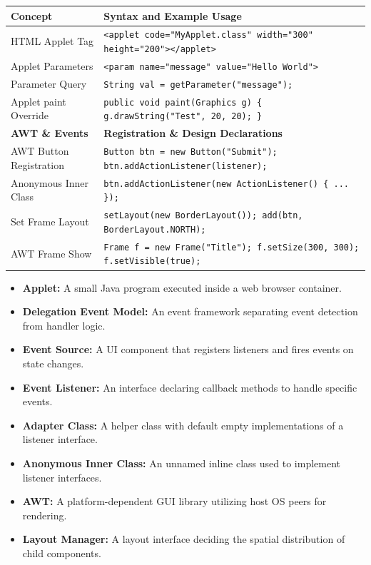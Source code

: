 \documentclass[12pt,a4paper]{article}
\renewcommand{\arraystretch}{1.45}
\begin{document}
\begin{tcolorbox}[formulabox, title={\textbf{HTML Applet \& Event Handling Syntax}}]
{\renewcommand{\arraystretch}{1.3}%
\begin{tabularx}{\linewidth}{l Y}
\textbf{Concept} & \textbf{Syntax and Example Usage} \\
\hline
HTML Applet Tag & \texttt{<applet code="MyApplet.class" width="300" height="200"></applet>} \\
Applet Parameters & \texttt{<param name="message" value="Hello World">} \\
Parameter Query & \texttt{String val = getParameter("message");} \\
Applet paint Override & \texttt{public void paint(Graphics g) \{ g.drawString("Test", 20, 20); \}} \\
\hline
\textbf{AWT \& Events} & \textbf{Registration \& Design Declarations} \\
\hline
AWT Button Registration & \texttt{Button btn = new Button("Submit"); btn.addActionListener(listener);} \\
Anonymous Inner Class & \texttt{btn.addActionListener(new ActionListener() \{ ... \});} \\
Set Frame Layout & \texttt{setLayout(new BorderLayout()); add(btn, BorderLayout.NORTH);} \\
AWT Frame Show & \texttt{Frame f = new Frame("Title"); f.setSize(300, 300); f.setVisible(true);} \\
\end{tabularx}}
\end{tcolorbox}

\begin{tcolorbox}[defbox, title={\textbf{One-Line Definitions}}]
\begin{itemize}[leftmargin=*, itemsep=2pt]
  \item \textbf{Applet:} A small Java program executed inside a web browser container.
  \item \textbf{Delegation Event Model:} An event framework separating event detection from handler logic.
  \item \textbf{Event Source:} A UI component that registers listeners and fires events on state changes.
  \item \textbf{Event Listener:} An interface declaring callback methods to handle specific events.
  \item \textbf{Adapter Class:} A helper class with default empty implementations of a listener interface.
  \item \textbf{Anonymous Inner Class:} An unnamed inline class used to implement listener interfaces.
  \item \textbf{AWT:} A platform-dependent GUI library utilizing host OS peers for rendering.
  \item \textbf{Layout Manager:} A layout interface deciding the spatial distribution of child components.
\end{itemize}
\end{tcolorbox}
\end{document}
